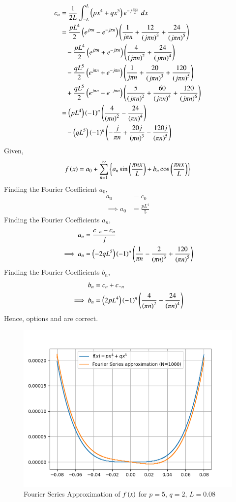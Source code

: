 \documentclass[journal,12pt,twocolumn]{IEEEtran}
\theoremstyle{remark}
\begin{document}
\begin{align}
    c_n&=\frac{1}{2L}\int_{-L}^{L}\left(px^4+qx^5\right)e^{-j\frac{\pi n x}{L}}\;dx\\
    &=\frac{pL^4}{2}\left(e^{j\pi n}-e^{-j\pi n}\right)\left(\frac{1}{j\pi n}+\frac{12}{\left(j\pi n\right)^3}+\frac{24}{\left(j\pi n\right)^5}\right)\notag\\
    &\;\;\;-\frac{pL^4}{2}\left(e^{j\pi n}+e^{-j\pi n}\right)\left(\frac{4}{\left(j\pi n\right)^2}+\frac{24}{\left(j\pi n\right)^4}\right)\notag\\
    &\;\;\;-\frac{qL^5}{2}\left(e^{j\pi n}+e^{-j\pi n}\right)\left(\frac{1}{j\pi n}+\frac{20}{\left(j\pi n\right)^3}+\frac{120}{\left(j\pi n\right)^5}\right)\notag\\
    &\;\;\;+\frac{qL^5}{2}\left(e^{j\pi n}-e^{-j\pi n}\right)\left(\frac{5}{\left(j\pi n\right)^2}+\frac{60}{\left(j\pi n\right)^4}+\frac{120}{\left(j\pi n\right)^6}\right)\\
    &=\left(pL^4\right)\left(-1\right)^n\left(\frac{4}{\left(\pi n\right)^2}-\frac{24}{\left(\pi n\right)^4}\right)\notag\\
    &\;\;\;-\left(qL^5\right)\left(-1\right)^n\left(-\frac{j}{{\pi n}}+\frac{20j}{\left(\pi n\right)^3}-\frac{120j}{\left(\pi n\right)^5}\right)
\end{align}
Given,
\begin{align}
    f\left(x\right)=a_0+\sum_{n=1}^{\infty}\left\{a_n\sin\left(\frac{\pi n x}{L}\right)+b_n\cos\left(\frac{\pi n x}{L}\right)\right\}
\end{align}
Finding the Fourier Coefficient $a_0$,
\begin{align}
    a_0&=c_0\\
    \implies a_0&=\frac{pL^4}{5}
\end{align}
Finding the Fourier Coefficients $a_n$,
\begin{align}
    a_n&=\frac{c_{-n}-c_n}{j}\\
    \implies a_n&=\left(-2qL^5\right)\left(-1\right)^{n}\left(\frac{1}{\pi n}-\frac{2}{\left(\pi n\right)^3}+\frac{120}{\left(\pi n\right)^5}\right)
\end{align}
Finding the Fourier Coefficients $b_n$,
\begin{align}
    b_n&=c_n+c_{-n}\\
    \implies b_n&=\left(2pL^4\right)\left(-1\right)^n\left(\frac{4}{\left(\pi n\right)^2}-\frac{24}{\left(\pi n\right)^4}\right)
\end{align}
Hence, options  and  are correct.
\begin{figure}[h!]
    \centering
    \includegraphics[width=\linewidth]{figs/Figure_1.png}
    \caption{Fourier Series Approximation of $f\left(x\right)$ for $p=5$, $q=2$, $L=0.08$}
\end{figure}
\end{document}
